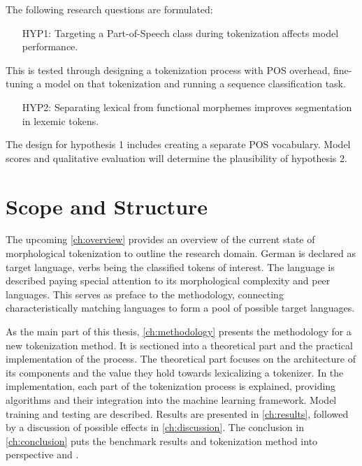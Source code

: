 \centerline{The following research questions are formulated:}
\begin{framed}
    \hypertarget{hyp1}{}
    \begin{itemize}[itemindent=1em]
        \item[HYP1:] Targeting a Part-of-Speech class during tokenization affects model performance.
    \end{itemize}
\end{framed}
\noindent This is tested through designing a tokenization process with POS overhead, fine-tuning a model on that tokenization and running a sequence classification task.
\begin{framed}
    \hypertarget{hyp2}{}
    \begin{itemize}[itemindent=1em]
        \item[HYP2:] Separating lexical from functional morphemes improves segmentation in lexemic tokens.
    \end{itemize}
\end{framed}
\noindent The design for hypothesis 1 includes creating a separate POS vocabulary.
Model scores and qualitative evaluation will determine the plausibility of hypothesis 2.

\section{Scope and Structure}
\label{sec:scope-and-structure}
The upcoming \autoref{ch:overview} provides an overview of the current state of morphological tokenization to outline the research domain.
German is declared as target language, verbs being the classified tokens of interest.
The language is described paying special attention to its morphological complexity and peer languages.
This serves as preface to the methodology, connecting characteristically matching languages to form a pool of possible  target languages.

As the main part of this thesis, \autoref{ch:methodology} presents the methodology for a new tokenization method.
It is sectioned into a theoretical part and the practical implementation of the process.
The theoretical part focuses on the architecture of its components and the value they hold towards lexicalizing a tokenizer.
In the implementation, each part of the tokenization process is explained, providing algorithms and their integration into the machine learning framework.
Model training and testing are described.
Results are presented in \autoref{ch:results}, followed by a discussion of possible effects in \autoref{ch:discussion}.
The conclusion in \autoref{ch:conclusion} puts the benchmark results and tokenization method into perspective and .
